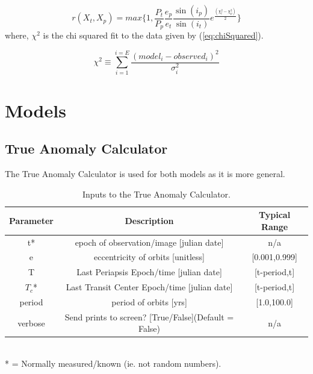 \documentclass[12pt,preprint]{aastex}
\begin{document}
\begin{equation}\label{eq:metHastingsReduced}
r(X_t,X_p) = max\bigg\{1, \frac{P_t}{P_p}\frac{e_p}{e_t}\frac{\sin(i_p)}{\sin(i_t)}e^{\frac{(\chi^2_t - \chi^2_p)}{2}} \bigg\}
\end{equation}
where, $\chi^2$ is the chi squared fit to the data given by (\ref{eq:chiSquared}).

\begin{equation}\label{eq:chiSquared}
{\chi}^{2} \equiv  \sum_{i=1}^{i=E} \frac{(model_i - observed_i)^{2}}{\sigma^{2}_i}
\end{equation}


\pagebreak


\section{Models}

\subsection{True Anomaly Calculator}\label{sec:TAcalc}
The True Anomaly Calculator is used for both models as it is more general.

\begin{table}[h]
\centering
\caption{ Inputs to the True Anomaly Calculator.}
\begin{tabular}{c c c}
\hline\hline
Parameter & Description & Typical Range \\
\hline
t* & epoch of observation/image [julian date] & n/a\\
e & eccentricity of orbits [unitless] & [0.001,0.999]\\
T & Last Periapsis Epoch/time [julian date] & [t-period,t]\\
$T_c$* & Last Transit Center Epoch/time [julian date] & [t-period,t]\\
period & period of orbits [yrs] & [1.0,100.0]\\
verbose & Send prints to screen? [True/False](Default = False) & n/a\\
\hline
\end{tabular}
\\
 * = Normally measured/known (ie. not random numbers).
\end{table}
\end{document}
